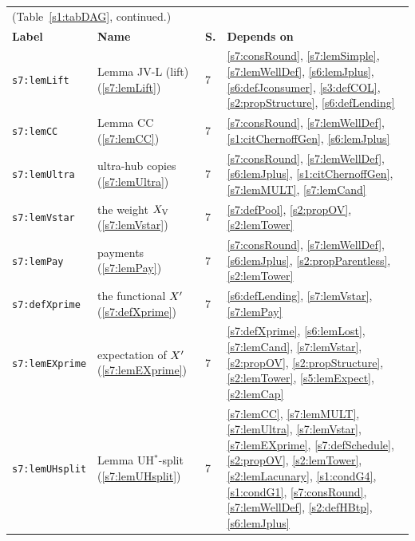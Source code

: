 \begin{center}
{\footnotesize
\setlength{\tabcolsep}{3pt}
\begin{tabular}{p{3.2cm}p{3.6cm}p{0.5cm}p{7.6cm}}
\multicolumn{4}{l}{(Table~\ref{s1:tabDAG}, continued.)}\\
\textbf{Label} & \textbf{Name} & \textbf{S.} & \textbf{Depends on}\\
\hline
\texttt{s7:lemLift} & Lemma JV-L (lift) (\ref{s7:lemLift}) & 7 & \ref{s7:consRound}, \ref{s7:lemSimple}, \ref{s7:lemWellDef}, \ref{s6:lemJplus}, \ref{s6:defJconsumer}, \ref{s3:defCOL}, \ref{s2:propStructure}, \ref{s6:defLending}\\
\texttt{s7:lemCC} & Lemma CC (\ref{s7:lemCC}) & 7 & \ref{s7:consRound}, \ref{s7:lemWellDef}, \ref{s1:citChernoffGen}, \ref{s6:lemJplus}\\
\texttt{s7:lemUltra} & ultra-hub copies (\ref{s7:lemUltra}) & 7 & \ref{s7:consRound}, \ref{s7:lemWellDef}, \ref{s6:lemJplus}, \ref{s1:citChernoffGen}, \ref{s7:lemMULT}, \ref{s7:lemCand}\\
\texttt{s7:lemVstar} & the weight $X_{\mathrm{V}}$ (\ref{s7:lemVstar}) & 7 & \ref{s7:defPool}, \ref{s2:propOV}, \ref{s2:lemTower}\\
\texttt{s7:lemPay} & payments (\ref{s7:lemPay}) & 7 & \ref{s7:consRound}, \ref{s7:lemWellDef}, \ref{s6:lemJplus}, \ref{s2:propParentless}, \ref{s2:lemTower}\\
\texttt{s7:defXprime} & the functional $X'$ (\ref{s7:defXprime}) & 7 & \ref{s6:defLending}, \ref{s7:lemVstar}, \ref{s7:lemPay}\\
\texttt{s7:lemEXprime} & expectation of $X'$ (\ref{s7:lemEXprime}) & 7 & \ref{s7:defXprime}, \ref{s6:lemLost}, \ref{s7:lemCand}, \ref{s7:lemVstar}, \ref{s2:propOV}, \ref{s2:propStructure}, \ref{s2:lemTower}, \ref{s5:lemExpect}, \ref{s2:lemCap}\\
\texttt{s7:lemUHsplit} & Lemma UH$^*$-split (\ref{s7:lemUHsplit}) & 7 & \ref{s7:lemCC}, \ref{s7:lemMULT}, \ref{s7:lemUltra}, \ref{s7:lemVstar}, \ref{s7:lemEXprime}, \ref{s7:defSchedule}, \ref{s2:propOV}, \ref{s2:lemTower}, \ref{s2:lemLacunary}, \ref{s1:condG4}, \ref{s1:condG1}, \ref{s7:consRound}, \ref{s7:lemWellDef}, \ref{s2:defHBtp}, \ref{s6:lemJplus}\\
\hline
\end{tabular}}
\end{center}

